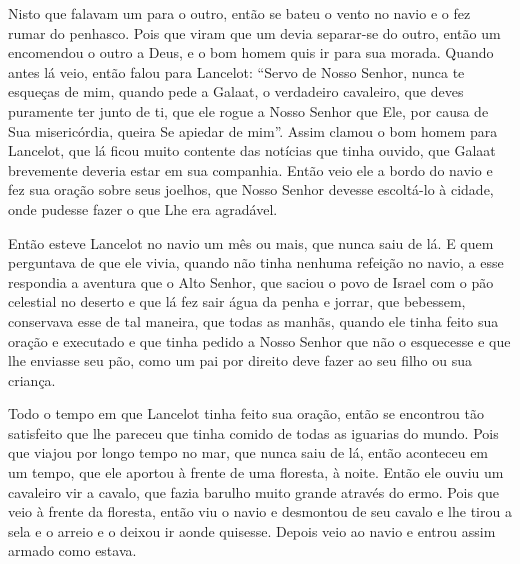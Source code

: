 Nisto que falavam um para o outro, então se bateu o vento no navio e o fez rumar
do penhasco. Pois que viram que um devia separar-se do outro, então um
encomendou o outro a Deus, e o bom homem quis ir para sua morada. Quando antes
lá veio, então falou para Lancelot: “Servo de Nosso Senhor, nunca te esqueças
de mim, quando pede a Galaat, o verdadeiro cavaleiro, que deves puramente ter
junto de ti, que ele rogue a Nosso Senhor que Ele, por causa de Sua
misericórdia, queira Se apiedar de mim”. Assim clamou o bom homem para
Lancelot, que lá ficou muito contente das notícias que tinha ouvido, que
Galaat brevemente deveria estar em sua companhia. Então veio ele a bordo do
navio e fez sua oração sobre seus joelhos, que Nosso Senhor devesse escoltá-lo
à cidade, onde pudesse fazer o que Lhe era agradável. 

Então esteve Lancelot no navio um mês ou mais, que nunca saiu de lá. E quem
perguntava de que ele vivia, quando não tinha nenhuma refeição no navio, a esse
respondia a aventura que o Alto Senhor, que saciou o povo de Israel com o pão
celestial no deserto e que lá fez sair água da penha e jorrar, que bebessem,
conservava esse de tal maneira, que todas as manhãs, quando ele tinha feito sua
oração e executado e que tinha pedido a Nosso Senhor que não o esquecesse e que
lhe enviasse seu pão, como um pai por direito deve fazer ao seu filho ou sua
criança.

Todo o tempo em que Lancelot tinha feito sua oração, então se encontrou tão
satisfeito que lhe pareceu que tinha comido de todas as iguarias do mundo. Pois
que viajou por longo tempo no mar, que nunca saiu de lá, então aconteceu em um
tempo, que ele aportou à frente de uma floresta, à noite. Então ele ouviu um
cavaleiro vir a cavalo, que fazia barulho muito grande através do ermo. Pois
que veio à frente da floresta, então viu o navio e desmontou de seu cavalo e
lhe tirou a sela e o arreio e o deixou ir aonde quisesse. Depois veio ao navio
e entrou assim armado como estava.

